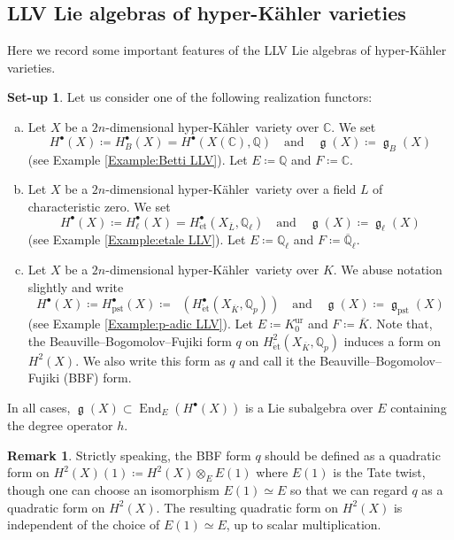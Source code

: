 \documentclass[12pt,reqno]{amsart}
\theoremstyle{definition}
\newtheorem{setup}[thm]{Set-up}
\newtheorem{rem}[thm]{Remark}
\newcommand{\Q}{{\mathds Q}}
\newcommand{\C}{{\mathds C}}
\DeclareMathOperator{\Dpst}{\mathit{D}_{\mathrm{pst}}}
\newcommand\End{\mathop{\mathrm{End}}\nolimits}
\renewcommand\ge{\mathop{\mathfrak{g}}\nolimits}
\newcommand{\et}{\mathrm{\acute{e}t}}
\newcommand{\hk}{hyper-Kähler~}
\DeclareMathOperator{\pst}{pst}
\DeclareMathOperator{\ur}{ur}
\numberwithin{equation}{section}
\begin{document}
\subsection{LLV Lie algebras of hyper-Kähler varieties}\label{Subsection:LLV Lie algebras of hyper-Kähler varieties}
Here we record some important features of the LLV Lie algebras of hyper-Kähler varieties.

\begin{setup}\label{Definition:LLV algebra Betti etale p-adic notation}
Let us consider one of the following realization functors:
\begin{enumerate}[(a)]
    \item Let $X$ be a $2n$-dimensional \hk variety over $\C$.
    We set
    \[
    H^\bullet(X)\coloneqq H^\bullet_B(X)=H^\bullet(X(\C), \Q) \quad \text{and} \quad \ge(X)\coloneqq \ge_B(X)
    \]
    (see Example \ref{Example:Betti LLV}).
    Let $E\coloneqq  \Q$ and $F\coloneqq \C$.
    \item Let $X$ be a $2n$-dimensional \hk variety over a field $L$ of characteristic zero.
    We set
    \[
    H^\bullet(X)\coloneqq H^\bullet_\ell(X)=H^\bullet_{\et}(X_{\overline{L}}, \Q_\ell) \quad \text{and} \quad \ge(X)\coloneqq \ge_\ell(X)
    \]
    (see Example \ref{Example:etale LLV}).
    Let $E \coloneqq  \Q_\ell$ and $F \coloneqq \overline{\Q}_\ell$.
    \item 
    Let $X$ be a $2n$-dimensional \hk variety over $K$.
    We abuse notation slightly and write
    \[
    H^\bullet(X)\coloneqq H^\bullet_{\pst}(X)\coloneqq \Dpst(H_{\et}^{\bullet}(X_{\overline{K}},\Q_{p})) \quad \text{and} \quad \ge(X)\coloneqq \ge_{\pst}(X)
    \]
    (see Example \ref{Example:p-adic LLV}).
    Let $E \coloneqq  K^{\ur}_0$ and $F \coloneqq \overline{K}$.
    Note that, the Beauville--Bogomolov--Fujiki form $q$ on $H^2_{\et} (X_{\overline{K}}, \Q_p)$ induces a form on $H^2(X)$.
    We also write this form as $q$ and call it the Beauville--Bogomolov--Fujiki (BBF) form.
\end{enumerate}
In all cases,
$\ge(X) \subset \End_E(H^\bullet(X))$
is a Lie subalgebra over $E$ containing the degree operator $h$.
\end{setup}

\begin{rem}\label{Remark:Tate twist}
     Strictly speaking,
     the BBF form $q$ should be defined as a quadratic form on 
     $H^2(X)(1)\coloneqq H^2(X) \otimes_E E(1)$
     where $E(1)$ is the Tate twist, though one can choose an isomorphism
     $E(1) \simeq E$
     so that we can regard $q$ as a quadratic form on 
     $H^2(X)$.
     The resulting quadratic form on $H^2(X)$ is independent of the choice of $E(1) \simeq E$, up to scalar multiplication.
\end{rem}
\end{document}
